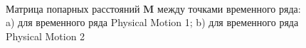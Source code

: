 \begin{figure}[h!t]\center
{}
\\
\caption{Матрица попарных расстояний $\textbf{M}$ между точками временного ряда: a) для временного ряда Physical Motion 1; b) для временного ряда Physical Motion 2}
\label{fig_real_distance}
\end{figure}

